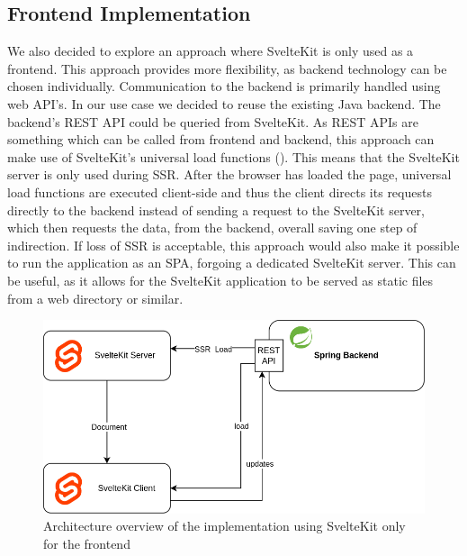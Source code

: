 \subsection{Frontend Implementation}



We also decided to explore an approach where SvelteKit is only used as a frontend. This approach provides more flexibility, as backend technology can be chosen individually. Communication to the backend is primarily handled using web API's. In our use case we decided to reuse the existing Java backend. The backend's REST API could be queried from SvelteKit. As REST APIs are something which can be called from frontend and backend, this approach can make use of SvelteKit's universal load functions (). This means that the SvelteKit server is only used during SSR. After the browser has loaded the page, universal load functions are executed client-side and thus the client directs its requests directly to the backend instead of sending  a request to the SvelteKit server, which then requests the data, from the backend, overall saving one step of indirection. If loss of SSR is acceptable, this approach would also make it possible to run the application as an SPA, forgoing a dedicated SvelteKit server. This can be useful, as it allows for the SvelteKit application to be served as static files from a web directory or similar.

\begin{figure}[ht]
    \centering
    \includegraphics[width=.6\linewidth]{assets/fe-only-client-takes-over}
    \caption{Architecture overview of the implementation using SvelteKit only for the frontend}
    \label{fig:dswfd-architecture-fe-only}
\end{figure}

